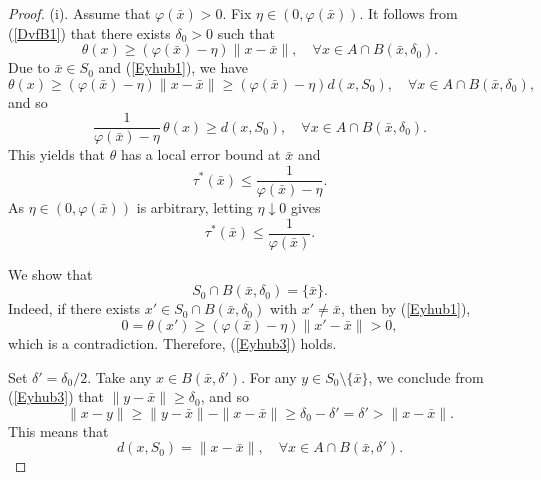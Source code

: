 \documentclass[11pt]{article}
\begin{document}
\begin{proof}   (i).  Assume that $	\varphi(\bar{x}) > 0$.    Fix $\eta \in (0, 	\varphi(\bar{x}))$.  It follows from  (\ref{DvfB1})  that    there exists $\delta_0 > 0$ such that
	\begin{equation}\label{Eyhub1}
		\theta(x) \ge (\varphi(\bar{x}) - \eta) \|x - \bar{x}\|,  \quad	\forall x \in A \cap B(\bar{x}, \delta_0). 
	\end{equation}
	Due to $\bar{x} \in S_0$ and (\ref{Eyhub1}), we have 
	$$ \theta(x) \ge (\varphi(\bar{x}) - \eta) \|x - \bar{x}\|  \ge  (\varphi(\bar{x}) - \eta) d(x, S_0) ,  \quad	\forall x \in A \cap B(\bar{x}, \delta_0), $$
	and so 
	$$ \frac{1}{	\varphi(\bar{x}) - \eta} \, \theta(x)    \ge   d(x, S_0) ,  \quad	\forall x \in A \cap B(\bar{x}, \delta_0). $$
	This yields  that $\theta$ has a  local error bound at $\bar x$ and 
	\[
	\tau^*(\bar{x}) \le \frac{1}{	\varphi(\bar{x}) - \eta}.
	\]
	As $\eta \in (0, 	\varphi(\bar{x}))$ is arbitrary, letting $\eta \downarrow 0$ gives
	\begin{equation}\label{Eyhub2}
		\tau^*(\bar{x}) \le \frac{1}{	\varphi(\bar{x})}.  
	\end{equation}
	
	We show that 
	\begin{equation}\label{Eyhub3}
		S_0 \cap B(\bar x, \delta_0) = \{\bar x\}.
	\end{equation}
	Indeed, if there exists $x' \in S_0 \cap B(\bar x, \delta_0)$ with $x' \neq \bar x$, then by  (\ref{Eyhub1}),
	\[
	0 = \theta(x') \ge  (	\varphi(\bar{x}) - \eta) \|x' - \bar x\| > 0,
	\]
	which is  a contradiction. Therefore,  (\ref{Eyhub3}) holds.
	
	Set $\delta' = \delta_0 /2$. Take any $x \in B(\bar{x}, \delta')$. For any $y \in S_0 \setminus \{\bar{x}\}$, we conclude from  (\ref{Eyhub3})  that $\|y - \bar{x}\| \ge \delta_0$,  and  so
	\[
	\|x - y\| \ge \|y - \bar{x}\| - \|x - \bar{x}\| \ge \delta_0 - \delta' = \delta' > \|x - \bar{x}\|.
	\]
	This means that
	\begin{equation}\label{Eyhub4}
		d(x, S_0) = \|x - \bar{x}\|,   \quad	\forall  x \in A \cap B(\bar{x}, \delta').
	\end{equation}
	

\end{proof}
\end{document}

